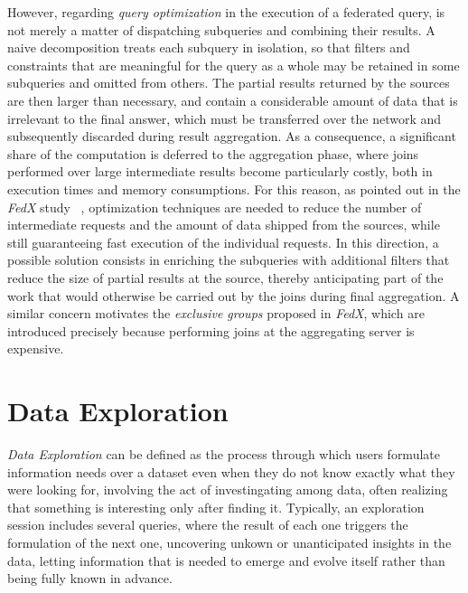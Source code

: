 However, regarding \textit{query optimization} in the execution of a federated
query, is not merely a matter of dispatching subqueries and combining their
results. A naive decomposition treats each subquery in isolation, so that
filters and constraints that are meaningful for the query as a whole may be
retained in some subqueries and omitted from others. The partial results
returned by the sources are then larger than necessary, and contain a
considerable amount of data that is irrelevant to the final answer, which must
be transferred over the network and subsequently discarded during result
aggregation. As a consequence, a significant share of the computation is
deferred to the aggregation phase, where joins performed over large intermediate
results become particularly costly, both in execution times and memory
consumptions. For this reason, as pointed out in the \textit{FedX} study
~\cite{schwarte2011fedx}, optimization techniques are needed to reduce the number
of intermediate requests and the amount of data shipped from the sources, while
still guaranteeing fast execution of the individual requests. In this direction,
a possible solution consists in enriching the subqueries with additional filters
that reduce the size of partial results at the source, thereby anticipating part
of the work that would otherwise be carried out by the joins during final
aggregation. A similar concern motivates the \textit{exclusive 
groups} proposed in \textit{FedX}, which are introduced precisely because
performing joins at the aggregating server is expensive.


\section{Data Exploration}
\textit{Data Exploration} can be defined as the process through which users
formulate information needs over a dataset even when they do not know exactly
what they were looking for, involving the act of investingating among data,
often realizing that something is interesting only after finding it. Typically,
an exploration session includes several queries, where the result of each one
triggers the formulation of the next one, uncovering unkown or unanticipated
insights in the data, letting information that is needed to emerge and evolve
itself rather than being fully known in advance.  

